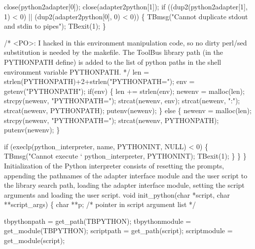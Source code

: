     close(python2adapter[0]); close(adapter2python[1]);
    if ((dup2(python2adapter[1], 1) < 0) || (dup2(adapter2python[0], 0) < 0)) \{
      TBmsg("Cannot duplicate stdout and stdin to pipes"); 
      TBexit(1);
    \}
    
    /* <PO>: I hacked in this environment manipulation code,
       so no dirty perl/sed substitution is needed by the makefile.
       The ToolBus library path (in the PYTHONPATH define) is added
       to the list of python paths in the shell environment variable 
       PYTHONPATH.
    */
    len = strlen(PYTHONPATH)+2+strlen("PYTHONPATH=");
    env = getenv("PYTHONPATH");
    if(env) \{
      len += strlen(env);
      newenv = malloc(len);
      strcpy(newenv, "PYTHONPATH=");
      strcat(newenv, env);
      strcat(newenv, ":");
      strcat(newenv, PYTHONPATH);
      putenv(newenv);
    \} else \{
      newenv = malloc(len);
      strcpy(newenv, "PYTHONPATH=");
      strcat(newenv, PYTHONPATH);
      putenv(newenv);
    \}
          
    if (execlp(python_interpreter, name, PYTHONINT, NULL) < 0) \{
      TBmsg("Cannot execute `%
            python_interpreter, PYTHONINT);
      TBexit(1);
    \}
  \}
\}
\nwendcode{}\nwdocspar
Initialization of the Python interpreter consists of resetting the
prompts, appending the pathnames of the adapter interface module and
the user script to the library search path, loading the adapter
interface module, setting the script arguments and loading the user
script.
\nwenddocs{}\plusendmoddef\nwstartdeflinemarkup{}\nwenddeflinemarkup
void init_python(char *script, char **script_args) \{
  char **p;                             /* pointer in script argument list */

  tbpythonpath = get_path(TBPYTHON);
  tbpythonmodule = get_module(TBPYTHON);
  scriptpath = get_path(script);
  scriptmodule = get_module(script);

